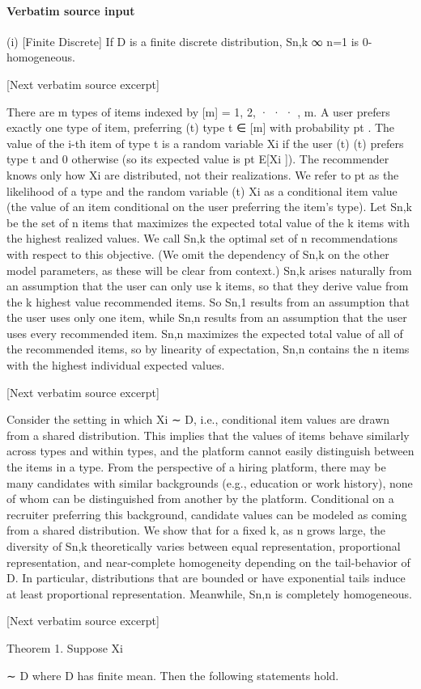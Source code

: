 \documentclass[10pt]{article}
\begin{document}
\paragraph{Verbatim source input}
\begin{ReviewVerbatim}
(i) [Finite Discrete] If D is a finite discrete distribution, {Sn,k }∞
n=1 is 0-homogeneous.

[Next verbatim source excerpt]

There are m types of items indexed by [m] = {1, 2, · · · , m}. A user prefers exactly one type of item, preferring
(t)
type t ∈ [m] with probability pt . The value of the i-th item of type t is a random variable Xi if the user
(t)
(t)
prefers type t and 0 otherwise (so its expected value is pt E[Xi ]). The recommender knows only how Xi
are distributed, not their realizations. We refer to pt as the likelihood of a type and the random variable
(t)
Xi as a conditional item value (the value of an item conditional on the user preferring the item’s type).
Let Sn,k be the set of n items that maximizes the expected total value of the k items with the highest
realized values. We call Sn,k the optimal set of n recommendations with respect to this objective. (We omit
the dependency of Sn,k on the other model parameters, as these will be clear from context.)
Sn,k arises naturally from an assumption that the user can only use k items, so that they derive value
from the k highest value recommended items. So Sn,1 results from an assumption that the user uses only
one item, while Sn,n results from an assumption that the user uses every recommended item.
Sn,n maximizes the expected total value of all of the recommended items, so by linearity of expectation,
Sn,n contains the n items with the highest individual expected values.

[Next verbatim source excerpt]

Consider the setting in which Xi ∼ D, i.e., conditional item values are drawn from a shared distribution.
This implies that the values of items behave similarly across types and within types, and the platform cannot
easily distinguish between the items in a type. From the perspective of a hiring platform, there may be many
candidates with similar backgrounds (e.g., education or work history), none of whom can be distinguished
from another by the platform. Conditional on a recruiter preferring this background, candidate values can
be modeled as coming from a shared distribution.
We show that for a fixed k, as n grows large, the diversity of Sn,k theoretically varies between equal
representation, proportional representation, and near-complete homogeneity depending on the tail-behavior
of D. In particular, distributions that are bounded or have exponential tails induce at least proportional
representation. Meanwhile, Sn,n is completely homogeneous.

[Next verbatim source excerpt]

Theorem 1. Suppose Xi

∼ D where D has finite mean. Then the following statements hold.
\end{ReviewVerbatim}
\end{document}
